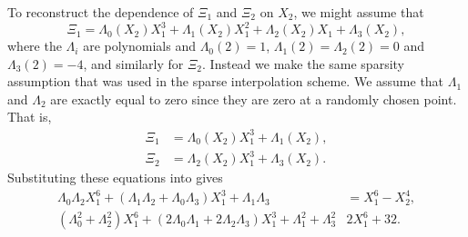 To reconstruct the dependence of $\Xi_1$ and $\Xi_2$ on $X_2$, we might
assume that
\[
\Xi_1 = \Lambda_0(X_2) X_1^3 + \Lambda_1(X_2) X_1^2 + \Lambda_2(X_2) X_1 + \Lambda_3(X_2),
\]
where the $\Lambda_i$ are polynomials and $\Lambda_0(2) = 1$, $\Lambda_1(2) = \Lambda_2(2) =
0$ and $\Lambda_3(2) = -4$, and similarly for $\Xi_2$.  Instead we make the
same sparsity assumption that was used in the sparse interpolation
scheme.  We assume that $\Lambda_1$ and $\Lambda_2$ are exactly equal to zero
since they are zero at a randomly chosen point.  That is,
\begin{equation} \label{SPH:2var:SolSkel:Eq}
\begin{aligned}
\Xi_1 & = \Lambda_0(X_2) X_1^3 + \Lambda_1(X_2), \\
\Xi_2 & = \Lambda_2(X_2) X_1^3 + \Lambda_3(X_2). 
\end{aligned}
\end{equation}
Substituting these equations into  gives
\[
\begin{aligned}
\Lambda_0 \Lambda_2 X_1^6 + (\Lambda_1 \Lambda_2 + \Lambda_0 \Lambda_3) X_1^3 + \Lambda_1 \Lambda_3 
    & = X_1^6 - X_2^4, \\
(\Lambda_0^2 + \Lambda_2^2) X_1^6 + (2 \Lambda_0 \Lambda_1 + 2\Lambda_2 \Lambda_3) X_1^3 + \Lambda_1^2 + \Lambda_3^2
    & 2X_1^6 + 32.
\end{aligned}
\]

